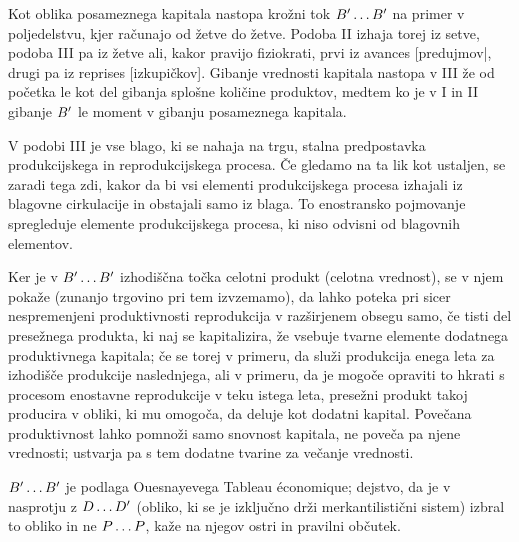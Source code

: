 \documentclass[kapital_02.tex]{subfiles}
\begin{document}
Kot oblika posameznega kapitala nastopa krožni tok \( B' \dots B' \) na primer v poljedelstvu, kjer računajo od žetve do žetve. Podoba II izhaja torej iz setve, podoba III pa iz žetve ali, kakor pravijo fiziokrati, prvi iz avances [predujmov|, drugi pa iz reprises [izkupičkov]. Gibanje vrednosti \KPEstran kapitala nastopa v III že od početka le kot del gibanja splošne količine produktov, medtem ko je v I in II gibanje \( B' \) le moment v gibanju posameznega kapitala.

V podobi III je vse blago, ki se nahaja na trgu, stalna predpostavka produkcijskega in reprodukcijskega procesa. Če gledamo na ta lik kot ustaljen, se zaradi tega zdi, kakor da bi vsi elementi produkcijskega procesa izhajali iz blagovne cirkulacije in obstajali samo iz blaga. To enostransko pojmovanje spregleduje elemente produkcijskega procesa, ki niso odvisni od blagovnih elementov.

Ker je v \( B' \dots B' \) izhodiščna točka celotni produkt (celotna vrednost), se v njem pokaže (zunanjo trgovino pri tem izvzemamo), da lahko poteka pri sicer nespremenjeni produktivnosti reprodukcija v razširjenem obsegu samo, če tisti del presežnega produkta, ki naj se kapitalizira, že vsebuje tvarne elemente dodatnega produktivnega kapitala; če se torej v primeru, da služi produkcija enega leta za izhodišče produkcije naslednjega, ali v primeru, da je mogoče opraviti to hkrati s procesom enostavne reprodukcije v teku istega leta, presežni produkt takoj producira v obliki, ki mu omogoča, da deluje kot dodatni kapital. Povečana produktivnost lahko pomnoži samo snovnost kapitala, ne poveča pa njene vrednosti; ustvarja pa s tem dodatne tvarine za večanje vrednosti.

\( B' \dots B' \) je podlaga Ouesnayevega Tableau \'economique; dejstvo, da je v nasprotju z \( D \dots D' \) (obliko, ki se je izključno drži merkantilistični sistem) izbral to obliko in ne
\( P \dots P \), kaže na njegov ostri in pravilni občutek.
 
\end{document}
